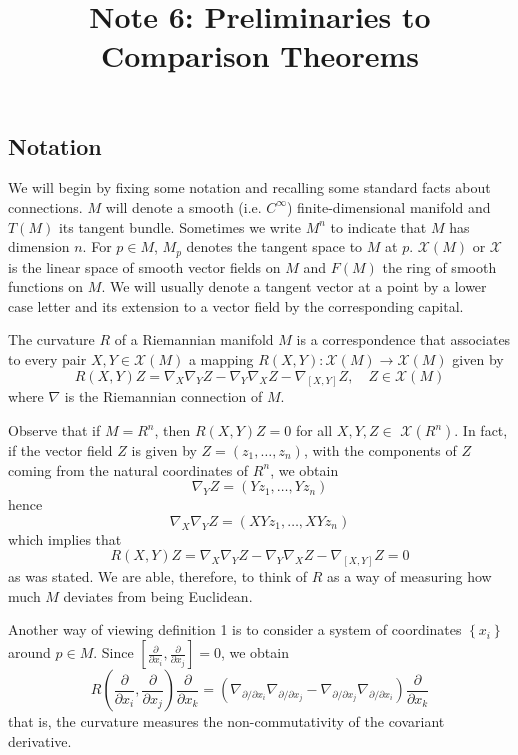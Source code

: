 \documentclass{ctexart}
\title{Note 6: Preliminaries to Comparison Theorems}
\date{} %
\begin{document}
\maketitle

\subsection*{Notation}
We will begin by fixing some notation and recalling some standard facts about connections. $M$ will denote a smooth (i.e. $C^\infty$) finite-dimensional
manifold and $T(M)$ its tangent bundle. Sometimes we write $M^n$ to indicate that $M$ has dimension $n$. For $p \in M$, 
$M_p$ denotes the tangent space to $M$ at $p$. $\mathcal{X}(M)$ or $\mathcal{X}$ is the linear space of smooth vector fields on $M$ and $F(M)$ the ring of 
smooth functions on $M$. We will usually denote a tangent vector at a point by a lower case letter and its extension to a vector field by the corresponding capital.

\begin{definition}
    The curvature $R$ of a Riemannian manifold $M$ is a correspondence that associates to every pair $X, Y \in \mathcal{X}(M)$ a mapping $R(X, Y): \mathcal{X}(M) \rightarrow \mathcal{X}(M)$ given by
    $$
    R(X, Y) Z=\nabla_X \nabla_Y Z-\nabla_Y \nabla_X Z-\nabla_{[X, Y]} Z, \quad Z \in \mathcal{X}(M)
    $$
    where $\nabla$ is the Riemannian connection of $M$.
\end{definition}
Observe that if $M=R^n$, then $R(X, Y) Z=0$ for all $X, Y, Z \in$ $\mathcal{X}\left(R^n\right)$. In fact, if the vector field $Z$ is given by $Z=\left(z_1, \ldots, z_n\right)$, with the components of $Z$ coming from the natural coordinates of $R^n$, we obtain
$$
\nabla_Y Z=\left(Y z_1, \ldots, Y z_n\right)
$$
hence
$$
\nabla_X \nabla_Y Z=\left(X Y z_1, \ldots, X Y z_n\right)
$$
which implies that
$$
R(X, Y) Z=\nabla_X \nabla_Y Z-\nabla_Y \nabla_X Z-\nabla_{[X, Y]} Z=0
$$
as was stated. We are able, therefore, to think of $R$ as a way of measuring how much $M$ deviates from being Euclidean.

Another way of viewing definition 1 is to consider a system of coordinates $\left\{x_i\right\}$ around $p \in M$. Since $\left[\frac{\partial}{\partial x_i}, \frac{\partial}{\partial x_j}\right]=0$, we obtain
$$
R\left(\frac{\partial}{\partial x_i}, \frac{\partial}{\partial x_j}\right) \frac{\partial}{\partial x_k}
=\left(\nabla_{\partial / \partial x_i} \nabla_{\partial / \partial x_j}-\nabla_{\partial / \partial x_j} \nabla_{\partial / \partial x_i}\right) \frac{\partial}{\partial x_k}
$$
that is, the curvature measures the non-commutativity of the covariant derivative. 
\end{document}
